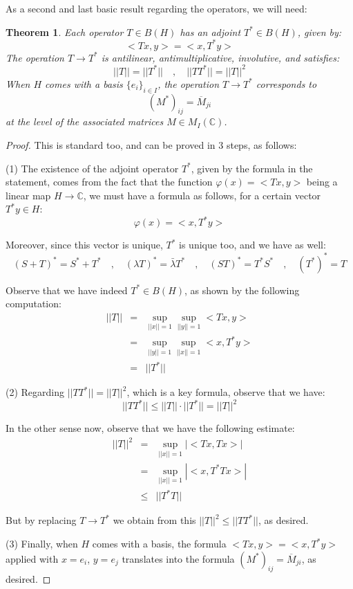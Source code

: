\documentclass[12pt]{amsbook}
\newtheorem{theorem}{Theorem}[chapter]
\begin{document}
As a second and last basic result regarding the operators, we will need:


\begin{theorem}
Each operator $T\in B(H)$ has an adjoint $T^*\in B(H)$, given by: 
$$<Tx,y>=<x,T^*y>$$
The operation $T\to T^*$ is antilinear, antimultiplicative, involutive, and satisfies:
$$||T||=||T^*||\quad,\quad ||TT^*||=||T||^2$$
When $H$ comes with a basis $\{e_i\}_{i\in I}$, the operation $T\to T^*$ corresponds to
$$(M^*)_{ij}=\overline{M}_{ji}$$ 
at the level of the associated matrices $M\in M_I(\mathbb C)$.
\end{theorem}

\begin{proof}
This is standard too, and can be proved in 3 steps, as follows:

\medskip

(1) The existence of the adjoint operator $T^*$, given by the formula in the statement, comes from the fact that the function $\varphi(x)=<Tx,y>$ being a linear map $H\to\mathbb C$, we must have a formula as follows, for a certain vector $T^*y\in H$:
$$\varphi(x)=<x,T^*y>$$

Moreover, since this vector is unique, $T^*$ is unique too, and we have as well:
$$(S+T)^*=S^*+T^*\quad,\quad
(\lambda T)^*=\bar{\lambda}T^*\quad,\quad 
(ST)^*=T^*S^*\quad,\quad 
(T^*)^*=T$$

Observe that we have indeed $T^*\in B(H)$, as shown by the following computation:
\begin{eqnarray*}
||T||
&=&\sup_{||x||=1}\sup_{||y||=1}<Tx,y>\\
&=&\sup_{||y||=1}\sup_{||x||=1}<x,T^*y>\\
&=&||T^*||
\end{eqnarray*}

(2) Regarding $||TT^*||=||T||^2$, which is a key formula, observe that we have:
$$||TT^*||
\leq||T||\cdot||T^*||
=||T||^2$$

In the other sense now, observe that we have the following estimate:
\begin{eqnarray*}
||T||^2
&=&\sup_{||x||=1}|<Tx,Tx>|\\
&=&\sup_{||x||=1}|<x,T^*Tx>|\\
&\leq&||T^*T||
\end{eqnarray*}

But by replacing $T\to T^*$ we obtain from this $||T||^2\leq||TT^*||$, as desired.

\medskip

(3) Finally, when $H$ comes with a basis, the formula $<Tx,y>=<x,T^*y>$ applied with $x=e_i$, $y=e_j$ translates into the formula $(M^*)_{ij}=\overline{M}_{ji}$, as desired.
\end{proof}
\end{document}
